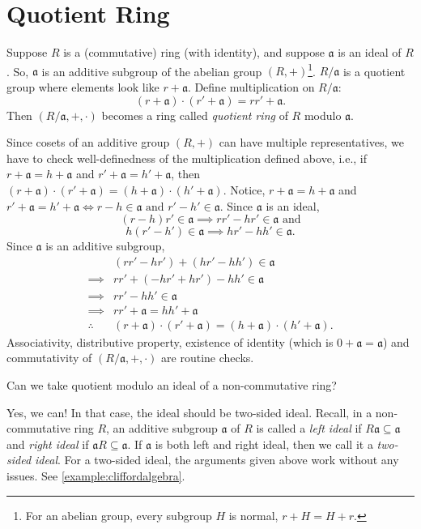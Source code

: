 \section{Quotient Ring}
\begin{definition}
    Suppose \(R\) is a (commutative) ring (with identity), and suppose \(\mathfrak{a}\) is an ideal of \(R\). So, \(\mathfrak{a}\) is an additive subgroup of the abelian group \((R, +)\)\footnote{For an abelian group, every subgroup \(H\) is normal, \(r + H = H + r\).}. \(R/\mathfrak{a}\) is a quotient group where elements look like \(r + \mathfrak{a}\). Define multiplication on \(R/\mathfrak{a}\): \[(r + \mathfrak{a}) \cdot (r' + \mathfrak{a}) = rr' + \mathfrak{a}.\] Then \((R/\mathfrak{a}, +, \cdot)\) becomes a ring called \emph{quotient ring} of \(R\) modulo \(\mathfrak{a}\).
\end{definition}
Since cosets of an additive group \((R, +)\) can have multiple representatives, we have to check well-definedness of the multiplication defined above, i.e., if \(r + \mathfrak{a} = h + \mathfrak{a}\) and \(r' + \mathfrak{a} = h' + \mathfrak{a}\), then \((r+\mathfrak{a}) \cdot (r'+\mathfrak{a}) = (h+\mathfrak{a})\cdot (h'+\mathfrak{a})\). Notice, \(r + \mathfrak{a} = h + \mathfrak{a}\) and \(r' + \mathfrak{a} = h' + \mathfrak{a} \Leftrightarrow r - h \in \mathfrak{a} \text{ and } r' - h' \in \mathfrak{a}\). Since \(\mathfrak{a}\) is an ideal, \[(r-h)r' \in \mathfrak{a} \implies rr' - hr' \in \mathfrak{a} \text{ and}\] \[h(r'-h') \in \mathfrak{a} \implies hr' - hh' \in \mathfrak{a}.\]
Since \(\mathfrak{a}\) is an additive subgroup,
\begin{align*}
    &(rr' - hr') + (hr' -hh') \in \mathfrak{a}\\
    \implies &rr' + (-hr' + hr') -hh' \in \mathfrak{a}\\
    \implies &rr' - hh' \in \mathfrak{a}\\
    \implies &rr' + \mathfrak{a} = hh' + \mathfrak{a}\\
    \therefore &(r+\mathfrak{a}) \cdot (r'+\mathfrak{a}) = (h + \mathfrak{a}) \cdot (h' + \mathfrak{a}).
\end{align*}
Associativity, distributive property, existence of identity (which is \(0 + \mathfrak{a} = \mathfrak{a}\)) and commutativity of \((R/\mathfrak{a}, +, \cdot)\) are routine checks.
\begin{ques}
    Can we take quotient modulo an ideal of a non-commutative ring?
\end{ques}
\begin{answer}[Instructor]
    Yes, we can! In that case, the ideal should be two-sided ideal. Recall, in a non-commutative ring \(R\), an additive subgroup \(\mathfrak{a}\) of \(R\) is called a \emph{left ideal} if \(R\mathfrak{a} \subseteq \mathfrak{a}\) and \emph{right ideal} if \(\mathfrak{a}R \subseteq \mathfrak{a}\). If \(\mathfrak{a}\) is both left and right ideal, then we call it a \emph{two-sided ideal}. For a two-sided ideal, the arguments given above work without any issues. See \autoref{example:cliffordalgebra}.
\end{answer}
